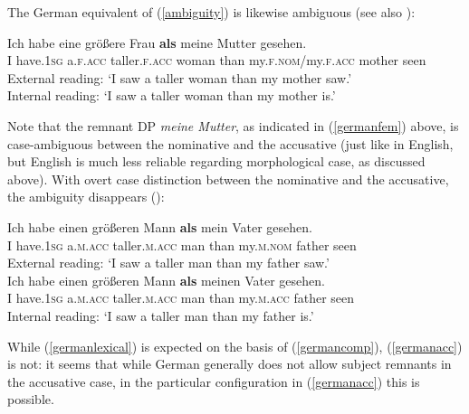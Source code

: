 The German equivalent of (\ref{ambiguity}) is likewise ambiguous (see also \citealt{bacskaiatkari2017atoh}):

\ea \gll Ich habe eine größere Frau \textbf{als} meine Mutter gesehen. \label{germanfem}\\
I have.\textsc{1sg} a.\textsc{f.acc} taller.\textsc{f.acc} woman than my.\textsc{f.nom}/my.\textsc{f.acc} mother seen\\
\glt External reading: `I saw a taller woman than my mother saw.'\\
Internal reading: `I saw a taller woman than my mother is.'
\z

Note that the remnant DP \textit{meine Mutter}, as indicated in (\ref{germanfem}) above, is case-ambiguous between the nominative and the accusative (just like in English, but English is much less reliable regarding morphological case, as discussed above). With overt case distinction between the nominative and the accusative, the ambiguity disappears (\citealt{bacskaiatkari2017atoh}):

\ea \label{germanmasc}
\ea \gll Ich habe einen größeren Mann \textbf{als} mein Vater gesehen. \label{germanlexical}\\
I have.\textsc{1sg} a.\textsc{m.acc} taller.\textsc{m.acc} man than my.\textsc{m.nom} father seen\\
\glt External reading: `I saw a taller man than my father saw.'\\
\ex \gll Ich habe einen größeren Mann \textbf{als} meinen Vater gesehen. \label{germanacc}\\
I have.\textsc{1sg} a.\textsc{m.acc} taller.\textsc{m.acc} man than my.\textsc{m.acc} father seen\\
\glt Internal reading: `I saw a taller man than my father is.'
\z
\z

While (\ref{germanlexical}) is expected on the basis of (\ref{germancomp}), (\ref{germanacc}) is not: it seems that while German generally does not allow subject remnants in the accusative case, in the particular configuration in (\ref{germanacc}) this is possible.

